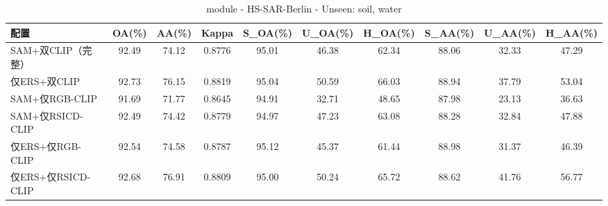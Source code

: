 \begin{table}[htbp]
\centering
\caption{module - HS-SAR-Berlin - Unseen: soil, water}
\begin{tabular}{lccccccccc}
\hline
配置 & OA(\%) & AA(\%) & Kappa & S\_OA(\%) & U\_OA(\%) & H\_OA(\%) & S\_AA(\%) & U\_AA(\%) & H\_AA(\%) \\
\hline
SAM+双CLIP（完整） & 92.49 & 74.12 & 0.8776 & 95.01 & 46.38 & 62.34 & 88.06 & 32.33 & 47.29 \\
仅ERS+双CLIP & 92.73 & 76.15 & 0.8819 & 95.04 & 50.59 & 66.03 & 88.94 & 37.79 & 53.04 \\
SAM+仅RGB-CLIP & 91.69 & 71.77 & 0.8645 & 94.91 & 32.71 & 48.65 & 87.98 & 23.13 & 36.63 \\
SAM+仅RSICD-CLIP & 92.49 & 74.42 & 0.8779 & 94.97 & 47.23 & 63.08 & 88.28 & 32.84 & 47.88 \\
仅ERS+仅RGB-CLIP & 92.54 & 74.58 & 0.8787 & 95.12 & 45.37 & 61.44 & 88.98 & 31.37 & 46.39 \\
仅ERS+仅RSICD-CLIP & 92.68 & 76.91 & 0.8809 & 95.00 & 50.24 & 65.72 & 88.62 & 41.76 & 56.77 \\
\hline
\end{tabular}
\end{table}